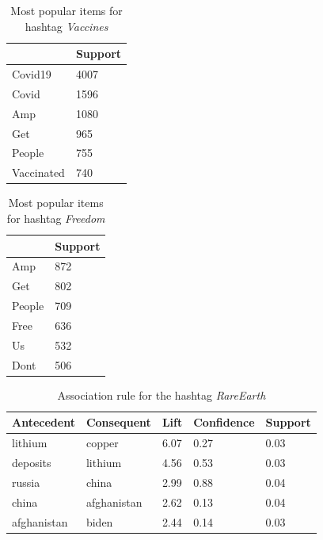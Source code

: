 \documentclass[12pt,%
               a4paper,%
               oneside,openany,%
               titlepage,%
               headinclude,footinclude,%
               BCOR5mm,%
               cleardoublepage=empty,%
               tablecaptionabove,%
               floatperchapter,
               ]{scrreprt}                 %
\begin{document}
\begin{table}[]
\caption{Most popular items for hashtag \textit{Vaccines}}
\begin{center}
\begin{tabular}{l|l}
           & \textbf{Support} \\ \hline
Covid19    & 4007    \\ \hline
Covid      & 1596    \\ \hline
Amp        & 1080    \\ \hline
Get        & 965     \\ \hline
People     & 755     \\ \hline
Vaccinated & 740
\label{POP_Vaccines}
\end{tabular}
\end{center}
\end{table}
\begin{table}[]
\caption{Most popular items for hashtag \textit{Freedom}}
\begin{center}
\begin{tabular}{l|l}
       &\textbf{ Support} \\ \hline
Amp    & 872     \\ \hline
Get    & 802     \\ \hline
People & 709     \\ \hline
Free   & 636     \\ \hline
Us     & 532     \\ \hline
Dont   & 506
\label{POP_Freedom}
\end{tabular}
\end{center}
\end{table}



\begin{table}[]
\caption{Association rule for the hashtag \textit{RareEarth}}
\begin{tabular}{l|l|l|l|l}
\textbf{Antecedent} & \textbf{Consequent}  & \textbf{Lift} & \textbf{Confidence} & \textbf{Support }\\ \hline
lithium     & copper      & 6.07 & 0.27       & 0.03    \\ \hline
deposits    & lithium     & 4.56 & 0.53       & 0.03    \\ \hline
russia      & china       & 2.99 & 0.88       & 0.04    \\ \hline
china       & afghanistan & 2.62 & 0.13       & 0.04    \\ \hline
afghanistan & biden       & 2.44 & 0.14       & 0.03
\label{ASS_RareEarth}
\end{tabular}
\end{table}
\end{document}
